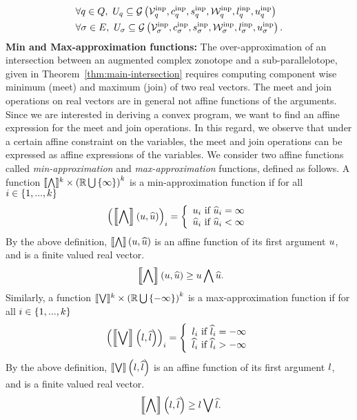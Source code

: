 %
\begin{align}
& \forall
\loc\in\locations,~\inputset_\loc\subseteq\acztope{\inputtemp_\loc}{\inputcen_\loc}{\inputsfact_\loc}{\inputstemp_\loc}{\inputlb_\loc}{\inputub_\loc}\\
& \forall \edge\in\edgeset,~\inputset_\edge\subseteq\acztope{\inputtemp_\edge}{\inputcen_\edge}{\inputsfact_\edge}{\inputstemp_\edge}{\inputlb_\edge}{\inputub_\edge}.
\end{align}
%
{\bf Min and Max-approximation functions:} The over-approximation of
an intersection between an augmented complex zonotope and a
sub-parallelotope, given in Theorem~\ref{thm:main-intersection}
requires computing component wise minimum (meet) and maximum (join) of
two real vectors.  The meet and join operations on real vectors are in
general not affine functions of the arguments.  Since we are
interested in deriving a convex program, we want to find an affine
expression for the meet and join operations.  In this regard, we
observe that under a certain affine constraint on the variables, the
meet and join operations can be expressed as affine expressions of the
variables.  We consider two affine functions
called \emph{min-approximation} and \emph{max-approximation}
functions, defined as follows.  A function
$\minapproxsymbol:\reals^k\times\lt(\reals\bigcup\set{\infty}\rt)^k$ is a
min-approximation function if for all $i\in\set{1,...,k}$
%
\[
\lt(\minapprox{\ub}{\pub}\rt)_i=
\lt\{
\begin{array}{l}
\ub_i~\text{if}~\pub_i=\infty\\
\pub_i~\text{if}~\pub_i<\infty
\end{array}
\rt.
\]
%
By the above definition, $\minapprox{\ub}{\pub}$ is an affine function of its
first argument $\ub$, and is a finite valued real vector.
%
\begin{equation}~\label{eqn:minapprox}
\minapprox{\ub}{\pub}\geq\meet{\ub}{\pub}.
\end{equation}
%
Similarly, a function
$\maxapproxsymbol:\reals^k\times\lt(\reals\bigcup\set{-\infty}\rt)^k$
is a max-approximation function if for all $i\in\set{1,...,k}$
%
\[
\lt(\maxapprox{\lb}{\plb}\rt)_i=
\lt\{
\begin{array}{l}
\lb_i~\text{if}~\plb_i=-\infty\\
\plb_i~\text{if}~\plb_i>-\infty
\end{array}
\rt.
\]
%
By the above definition, $\maxapprox{\lb}{\plb}$ is an affine function
of its first argument $\lb$, and is a finite valued real vector.
%
\begin{equation}~\label{eqn:minapprox}
\minapprox{\lb}{\plb}\geq\join{\lb}{\plb}.
\end{equation}

